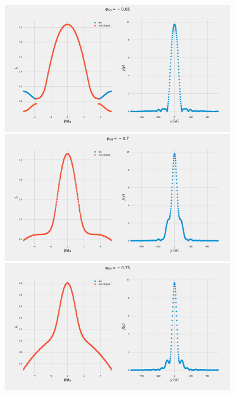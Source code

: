 \documentclass[a4paper]{article}
\begin{document}
\begin{figure}
	\includegraphics[width=0.9\textwidth]{figs/wg32vbg05/current_and_density_065}
	\includegraphics[width=0.9\textwidth]{figs/wg32vbg05/current_and_density_07}
	\includegraphics[width=0.9\textwidth]{figs/wg32vbg05/current_and_density_075}
\end{figure}
\end{document}

